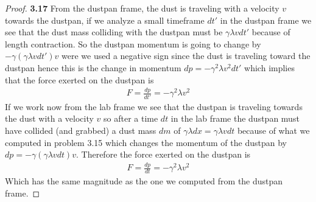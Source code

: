 \documentclass[11pt]{article}
\theoremstyle{definition}
\begin{document}
\cleardoublepage
\begin{proof}{\textbf{3.17}}
    From the dustpan frame, the dust is traveling with a velocity $v$ towards
    the dustpan, if we analyze a small timeframe $dt'$ in the dustpan frame
    we see that the dust mass colliding with the dustpan must be
    $\gamma\lambda vdt'$ because of length contraction. So the dustpan momentum 
    is going to change by $-\gamma(\gamma\lambda vdt')v$ were we
    used a negative sign since the dust is traveling toward the dustpan hence
    this is the change in momentum $dp = -\gamma^{2}\lambda v^2dt'$ which
    implies that the force exerted on the dustpan is
    \begin{align*}
        F = \frac{dp}{dt'} = -\gamma^{2}\lambda v^2
    \end{align*}
    If we work now from the lab frame we see that the dustpan is traveling
    towards the dust with a velocity $v$ so after a time $dt$ in the lab frame
    the dustpan must have collided (and grabbed) a dust mass $dm$ of
    $\gamma \lambda dx = \gamma \lambda vdt$ because of what we computed
    in problem 3.15 which changes the momentum of the dustpan by
    $dp = -\gamma (\gamma\lambda vdt) v$. 
    Therefore the force exerted on the dustpan is
    \begin{align*}
        F = \frac{dp}{dt} = -\gamma^{2}\lambda v^2
    \end{align*}
    Which has the same magnitude as the one we computed from the dustpan frame. 
\end{proof}
\end{document}

